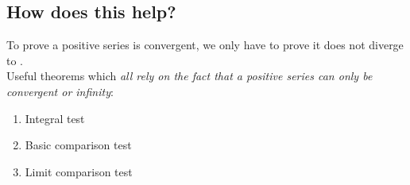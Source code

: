 \documentclass[../13.tex]{subfiles}
\begin{document}
\subsection*{How does this help?}
To prove a positive series is convergent, we only have to prove it does not diverge to \DS{\infty}.\\
Useful theorems which \emph{all rely on the fact that a positive series can only be convergent or infinity}: \begin{enumerate}
    \item Integral test
    \item Basic comparison test
    \item Limit comparison test
\end{enumerate}
\end{document}
